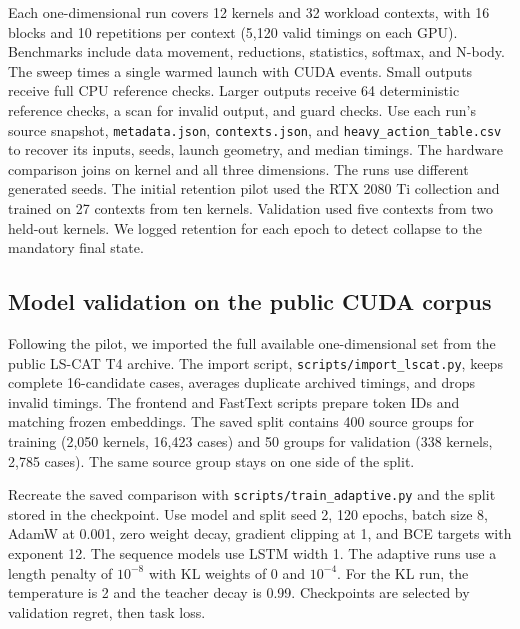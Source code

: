 \documentclass[11pt,letterpaper]{article}
\begin{document}
Each one-dimensional run covers 12 kernels and 32 workload contexts, with 16 blocks and 10 repetitions per
context (5,120 valid timings on each GPU). Benchmarks include data movement, reductions, statistics,
softmax, and N-body. The sweep times a single warmed launch with CUDA events. Small outputs receive full CPU
reference checks. Larger outputs receive 64 deterministic reference checks, a scan for invalid output, and
guard checks. Use each run's source snapshot, \texttt{metadata.json}, \texttt{contexts.json}, and
\texttt{heavy\_action\_table.csv} to recover its inputs, seeds, launch geometry, and median timings. The
hardware comparison joins on kernel and all three dimensions. The runs use different generated seeds. The
initial retention pilot used the RTX 2080 Ti collection and trained on 27 contexts from ten kernels.
Validation used five contexts from two held-out kernels. We logged retention for each epoch to detect
collapse to the mandatory final state.


\subsection{Model validation on the public CUDA corpus}

Following the pilot, we imported the full available one-dimensional set from the public LS-CAT T4 archive.
The import script, \texttt{scripts/import\_lscat.py}, keeps complete 16-candidate cases, averages duplicate
archived timings, and drops invalid timings. The frontend and FastText scripts prepare token IDs and
matching frozen embeddings. The saved split contains 400 source groups for training (2,050 kernels, 16,423
cases) and 50 groups for validation (338 kernels, 2,785 cases). The same source group stays on one side of
the split.


Recreate the saved comparison with \texttt{scripts/train\_adaptive.py} and the split stored in the
checkpoint. Use model and split seed 2, 120 epochs, batch size 8, AdamW at 0.001, zero weight decay,
gradient clipping at 1, and BCE targets with exponent 12. The sequence models use LSTM width 1. The adaptive
runs use a length penalty of \(10^{-8}\) with KL weights of 0 and \(10^{-4}\). For the KL run, the
temperature is 2 and the teacher decay is 0.99. Checkpoints are selected by validation regret, then task
loss.
\end{document}

